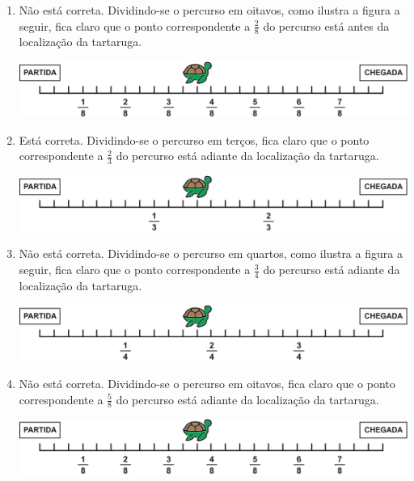 \documentclass[10 pt,usenames,dvipsnames, oneside]{article}
\begin{document}
\begin{solucao}
\begin{enumerate}
\item     Não está correta. Dividindo-se o percurso em oitavos, como ilustra a figura a seguir, fica claro que o ponto correspondente a     $\frac{2}{8}$     do percurso está antes da localização da tartaruga. 
\begin{center}
\includegraphics[width=390pt, keepaspectratio]{ativ9_resp_e}
\end{center}

\item     Está correta. Dividindo-se o percurso em terços, fica claro que o ponto correspondente a     $\frac{2}{3}$     do percurso está adiante da localização da tartaruga.

\begin{center} \includegraphics[width=390pt, keepaspectratio]{ativ9_resp_f}
\end{center}


\item     Não está correta. Dividindo-se o percurso em quartos, como ilustra a figura a seguir, fica claro que o ponto correspondente a     $\frac{3}{4}$     do percurso está adiante da localização da tartaruga.

\begin{center} \includegraphics[width=390pt, keepaspectratio]{ativ9_resp_g}
\end{center}

\item     Não está correta. Dividindo-se o percurso em oitavos, fica claro que o ponto correspondente a     $\frac{5}{8}$     do percurso está adiante da localização da tartaruga.

\begin{center}
\includegraphics[width=390pt, keepaspectratio]{ativ9_resp_h}
\end{center}


\end{enumerate}
\end{solucao}
\end{document}
